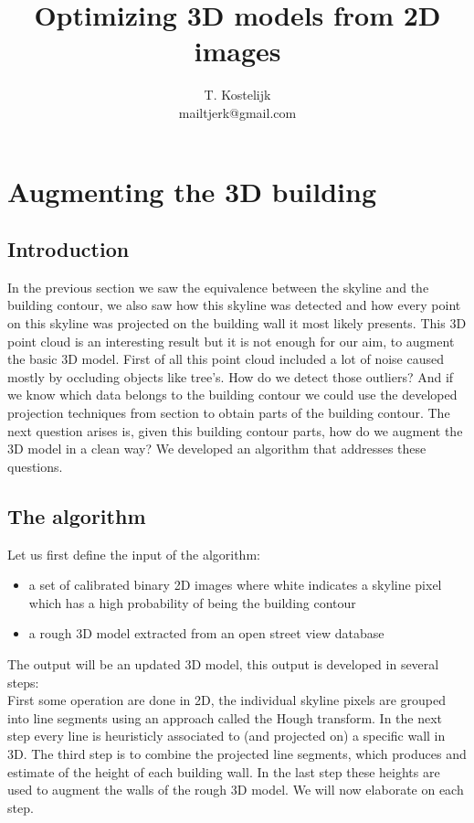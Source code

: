 \documentclass[10pt]{article}
\title{\sc Optimizing 3D models from 2D images}
\author{T. Kostelijk\\mailtjerk@gmail.com}
\begin{document}
\maketitle


\section{Augmenting the 3D building}
\subsection{Introduction}
In the previous section we saw the equivalence between the skyline and the building contour, we also saw how this skyline was detected and how every point on this skyline was projected on the building wall it most likely presents. 
This 3D point cloud is an interesting result but it is not enough for our aim, to augment the basic 3D model.
First of all this point cloud included a lot of noise caused mostly by occluding objects like tree's. How do we detect those outliers?
And if we know which data belongs to the building contour we could use the developed projection techniques from section %
to obtain parts of the building contour.
The next question arises is, given this building contour parts, how do we augment the 3D model in a clean way?
We developed an algorithm that addresses these questions.
\subsection{The algorithm}
Let us first define the input of the algorithm:
\begin{itemize}
	\item a set of calibrated binary 2D images where white indicates a skyline pixel which has a high probability of being the building contour
	\item a rough 3D model extracted from an open street view database
\end{itemize}
The output will be an updated 3D model, this output is developed in several steps:\\
First some operation are done in 2D, the individual skyline pixels are grouped into line segments using an approach called the Hough transform. In the next step every line is heuristicly associated to (and projected on) a specific wall in 3D. The third step is to combine the projected line segments, which produces and estimate of the height of each building wall. In the last step these heights are used to augment the walls of the rough 3D model.
We will now elaborate on each step.
\end{document}
